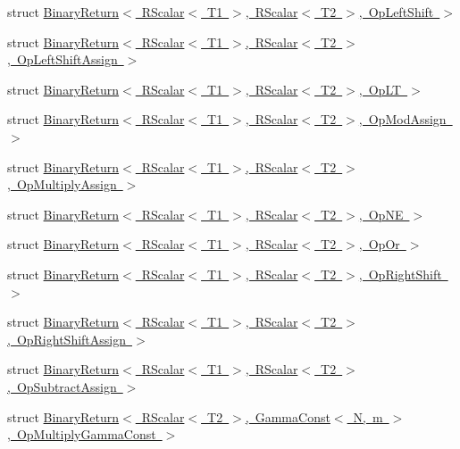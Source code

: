 \begin{DoxyCompactItemize}
\item 
struct \mbox{\hyperlink{structENSEM_1_1BinaryReturn_3_01RScalar_3_01T1_01_4_00_01RScalar_3_01T2_01_4_00_01OpLeftShift_01_4}{Binary\+Return$<$ R\+Scalar$<$ T1 $>$, R\+Scalar$<$ T2 $>$, Op\+Left\+Shift $>$}}
\item 
struct \mbox{\hyperlink{structENSEM_1_1BinaryReturn_3_01RScalar_3_01T1_01_4_00_01RScalar_3_01T2_01_4_00_01OpLeftShiftAssign_01_4}{Binary\+Return$<$ R\+Scalar$<$ T1 $>$, R\+Scalar$<$ T2 $>$, Op\+Left\+Shift\+Assign $>$}}
\item 
struct \mbox{\hyperlink{structENSEM_1_1BinaryReturn_3_01RScalar_3_01T1_01_4_00_01RScalar_3_01T2_01_4_00_01OpLT_01_4}{Binary\+Return$<$ R\+Scalar$<$ T1 $>$, R\+Scalar$<$ T2 $>$, Op\+L\+T $>$}}
\item 
struct \mbox{\hyperlink{structENSEM_1_1BinaryReturn_3_01RScalar_3_01T1_01_4_00_01RScalar_3_01T2_01_4_00_01OpModAssign_01_4}{Binary\+Return$<$ R\+Scalar$<$ T1 $>$, R\+Scalar$<$ T2 $>$, Op\+Mod\+Assign $>$}}
\item 
struct \mbox{\hyperlink{structENSEM_1_1BinaryReturn_3_01RScalar_3_01T1_01_4_00_01RScalar_3_01T2_01_4_00_01OpMultiplyAssign_01_4}{Binary\+Return$<$ R\+Scalar$<$ T1 $>$, R\+Scalar$<$ T2 $>$, Op\+Multiply\+Assign $>$}}
\item 
struct \mbox{\hyperlink{structENSEM_1_1BinaryReturn_3_01RScalar_3_01T1_01_4_00_01RScalar_3_01T2_01_4_00_01OpNE_01_4}{Binary\+Return$<$ R\+Scalar$<$ T1 $>$, R\+Scalar$<$ T2 $>$, Op\+N\+E $>$}}
\item 
struct \mbox{\hyperlink{structENSEM_1_1BinaryReturn_3_01RScalar_3_01T1_01_4_00_01RScalar_3_01T2_01_4_00_01OpOr_01_4}{Binary\+Return$<$ R\+Scalar$<$ T1 $>$, R\+Scalar$<$ T2 $>$, Op\+Or $>$}}
\item 
struct \mbox{\hyperlink{structENSEM_1_1BinaryReturn_3_01RScalar_3_01T1_01_4_00_01RScalar_3_01T2_01_4_00_01OpRightShift_01_4}{Binary\+Return$<$ R\+Scalar$<$ T1 $>$, R\+Scalar$<$ T2 $>$, Op\+Right\+Shift $>$}}
\item 
struct \mbox{\hyperlink{structENSEM_1_1BinaryReturn_3_01RScalar_3_01T1_01_4_00_01RScalar_3_01T2_01_4_00_01OpRightShiftAssign_01_4}{Binary\+Return$<$ R\+Scalar$<$ T1 $>$, R\+Scalar$<$ T2 $>$, Op\+Right\+Shift\+Assign $>$}}
\item 
struct \mbox{\hyperlink{structENSEM_1_1BinaryReturn_3_01RScalar_3_01T1_01_4_00_01RScalar_3_01T2_01_4_00_01OpSubtractAssign_01_4}{Binary\+Return$<$ R\+Scalar$<$ T1 $>$, R\+Scalar$<$ T2 $>$, Op\+Subtract\+Assign $>$}}
\item 
struct \mbox{\hyperlink{structENSEM_1_1BinaryReturn_3_01RScalar_3_01T2_01_4_00_01GammaConst_3_01N_00_01m_01_4_00_01OpMultiplyGammaConst_01_4}{Binary\+Return$<$ R\+Scalar$<$ T2 $>$, Gamma\+Const$<$ N, m $>$, Op\+Multiply\+Gamma\+Const $>$}}

\end{DoxyCompactItemize}
